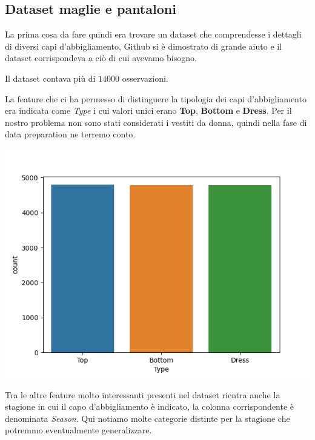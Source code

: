 \documentclass[a4paper, 11pt, oneside]{report}
\begin{document}
                \subsection{Dataset maglie e pantaloni}
                La prima cosa da fare quindi era trovare un dataset che comprendesse i dettagli di diversi capi d'abbigliamento,
                Github si è dimostrato di grande aiuto e il dataset \cite{6} corrispondeva a ciò di cui avevamo bisogno.
                \\
                \par \noindent Il dataset contava più di $14000$ osservazioni.
                \\
                \par \noindent La feature che ci ha permesso di distinguere la tipologia dei capi d'abbigliamento
                era indicata come \textit{Type} i cui valori unici erano \textbf{Top}, \textbf{Bottom} e \textbf{Dress}.
                Per il nostro problema non sono stati considerati i vestiti da donna, quindi nella fase di data preparation
                ne terremo conto.
                \begin{center}
                    \includegraphics[scale=0.4]{countTopBottom}
                \end{center}
                \bigskip
                \par \noindent Tra le altre feature molto interessanti presenti nel dataset rientra anche la stagione
                in cui il capo d'abbigliamento è indicato, la colonna corrispondente è denominata \textit{Season}.
                Qui notiamo molte categorie distinte per la stagione che potremmo eventualmente generalizzare.
\end{document}
